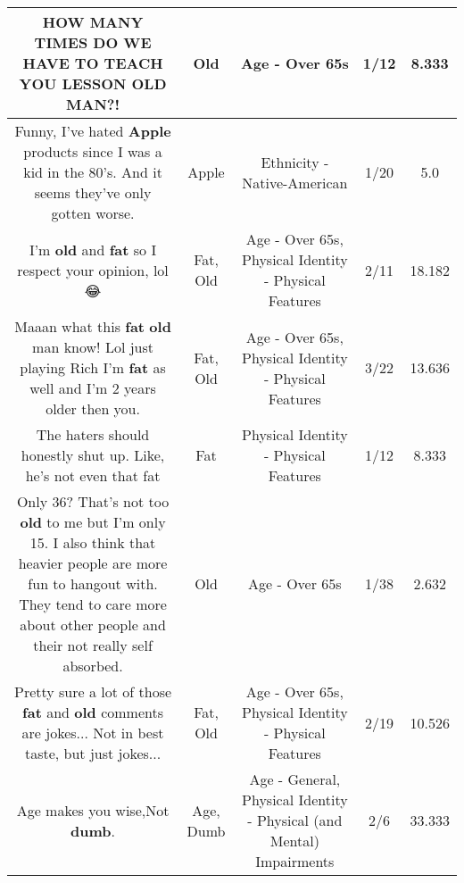 \documentclass[11pt]{article}
\newlength\mylength
\begin{document}
\begin{center}
\begin{longtable}{|C{.65\mylength}|C{.30\mylength}|C{.12\mylength}|C{.12\mylength}|C{.12\mylength}|}
  \small HOW MANY TIMES DO WE HAVE TO TEACH YOU LESSON \textbf{OLD} MAN?!\normalsize   & Old & Age - Over 65s & 1/12 & 8.333 \\  \hline
  \small Funny, I've hated \textbf{Apple} products since I was a kid in the 80's. And it seems they've only gotten worse.\normalsize   & Apple & Ethnicity - Native-American & 1/20 & 5.0 \\  \hline
  \small I'm \textbf{old} and \textbf{fat} so I respect your opinion, lol 😂\normalsize   & Fat, Old & Age - Over 65s, Physical Identity - Physical Features & 2/11 & 18.182 \\  \hline
  \small Maaan what this \textbf{fat} \textbf{old} man know! Lol just playing Rich I'm \textbf{fat} as well and I'm 2 years older then you.\normalsize   & Fat, Old & Age - Over 65s, Physical Identity - Physical Features & 3/22 & 13.636 \\  \hline
  \small The haters should honestly shut up. Like, he's not even that fat\normalsize   & Fat & Physical Identity - Physical Features & 1/12 & 8.333 \\  \hline
  \small Only 36?  That's not too \textbf{old} to me but I'm only 15. I also think that heavier people are more fun to hangout with. They tend to care more about other people and their not really self absorbed.\normalsize   & Old & Age - Over 65s & 1/38 & 2.632 \\  \hline
  \small Pretty sure a lot of those \textbf{fat} and \textbf{old} comments are jokes... Not in best taste, but just jokes...\normalsize   & Fat, Old & Age - Over 65s, Physical Identity - Physical Features & 2/19 & 10.526 \\  \hline
  \small Age makes you wise,Not \textbf{dumb}.\normalsize   & Age, Dumb & Age - General, Physical Identity - Physical (and Mental) Impairments & 2/6 & 33.333 \\  \hline

\end{longtable}
\end{center}
\end{document}
